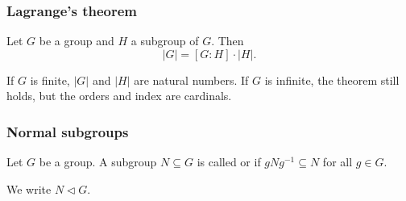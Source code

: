 \subsubsection{Lagrange's theorem}
\begin{theorem}
Let $G$ be a group and $H$ a subgroup of $G$. Then
\[ |G| = [G:H]\cdot |H|. \]
\end{theorem}
If $G$ is finite, $|G|$ and $|H|$ are natural numbers. If $G$ is infinite, the theorem still holds, but the orders and index are cardinals.

\subsubsection{Normal subgroups}
\begin{definition}
Let $G$ be a group. A subgroup $N\subseteq G$ is called  or  if $gNg^{-1} \subseteq N$ for all $g\in G$.

We write $N \lhd G$.
\end{definition}

